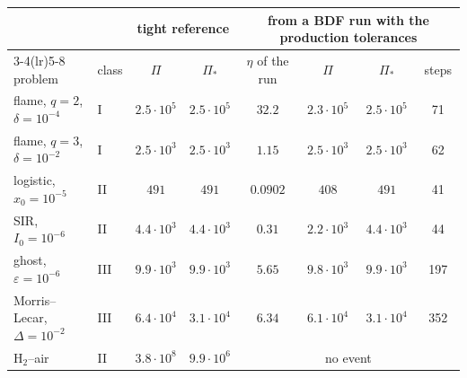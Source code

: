 \begin{tabular}{llcccccc}
\toprule
& & \multicolumn{2}{c}{tight reference} & \multicolumn{4}{c}{from a BDF run with the production tolerances}\\
\cmidrule(lr){3-4}\cmidrule(lr){5-8}
problem & class & $\Pi$ & $\Pi_*$ & $\eta$ of the run & $\Pi$ & $\Pi_*$ & steps\\
\midrule
flame, $q=2$, $\delta=10^{-4}$ & I & $2.5\cdot10^{5}$ & $2.5\cdot10^{5}$ & $32.2$ & $2.3\cdot10^{5}$ & $2.5\cdot10^{5}$ & 71\\
flame, $q=3$, $\delta=10^{-2}$ & I & $2.5\cdot10^{3}$ & $2.5\cdot10^{3}$ & $1.15$ & $2.5\cdot10^{3}$ & $2.5\cdot10^{3}$ & 62\\
logistic, $x_0=10^{-5}$ & II & $491$ & $491$ & $0.0902$ & $408$ & $491$ & 41\\
SIR, $I_0=10^{-6}$ & II & $4.4\cdot10^{3}$ & $4.4\cdot10^{3}$ & $0.31$ & $2.2\cdot10^{3}$ & $4.4\cdot10^{3}$ & 44\\
ghost, $\varepsilon=10^{-6}$ & III & $9.9\cdot10^{3}$ & $9.9\cdot10^{3}$ & $5.65$ & $9.8\cdot10^{3}$ & $9.9\cdot10^{3}$ & 197\\
Morris--Lecar, $\Delta=10^{-2}$ & III & $6.4\cdot10^{4}$ & $3.1\cdot10^{4}$ & $6.34$ & $6.1\cdot10^{4}$ & $3.1\cdot10^{4}$ & 352\\
H$_2$--air & II & $3.8\cdot10^{8}$ & $9.9\cdot10^{6}$ & \multicolumn{4}{c}{no event}\\
\bottomrule
\end{tabular}
